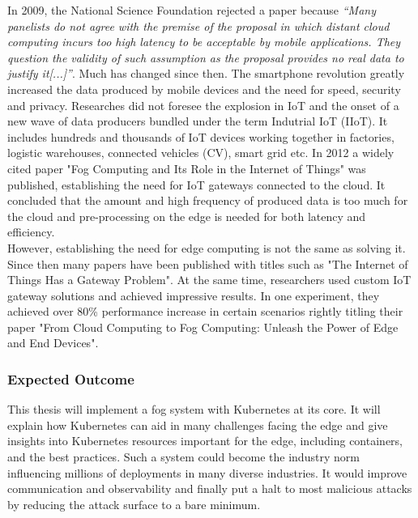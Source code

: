 {In 2009, the National Science Foundation rejected a paper because \textit{``Many panelists do not agree with the premise of the proposal in which distant cloud computing incurs too high latency to be acceptable by mobile applications. They question the validity of such assumption as the proposal provides no real data to justify it[...]''}\cite{satyanarayanan2015briefHistoryIoTGateway}. Much has changed since then. The smartphone revolution greatly increased the data produced by mobile devices and the need for speed, security and privacy. Researches did not foresee the explosion in IoT and the onset of a new wave of data producers bundled under the term Indutrial IoT (IIoT). It includes hundreds and thousands of IoT devices working together in factories, logistic warehouses, connected vehicles (CV), smart grid etc. In 2012 a widely cited paper "Fog Computing and Its Role in the Internet of Things"\cite{fogComputing:def} was published, establishing the need for IoT gateways connected to the cloud. It concluded that the amount and high frequency of produced data is too much for the cloud and pre-processing on the edge is needed for both latency and efficiency.\\
However, establishing the need for edge computing is not the same as solving it. Since then many papers have been published with titles such as "The Internet of Things Has a Gateway Problem"\cite{zachariah2015internetOfThingsHasGatewayProblem}. At the same time, researchers used custom IoT gateway solutions and achieved impressive results. In one experiment, they achieved over 80\% performance increase in certain scenarios rightly titling their paper "From Cloud Computing to Fog Computing: Unleash the Power of Edge and End Devices"\cite{hong2017fromCloudtoIoTGatewayUnleashingTHePower}.\\
}

\subsubsection{Expected Outcome}
This thesis will implement a fog system with Kubernetes at its core. It will explain how Kubernetes can aid in many challenges facing the edge and give insights into Kubernetes resources important for the edge, including containers, and the best practices. Such a system could become the industry norm influencing millions of deployments in many diverse industries. It would improve communication and observability and finally put a halt to most malicious attacks by reducing the attack surface to a bare minimum.\\

